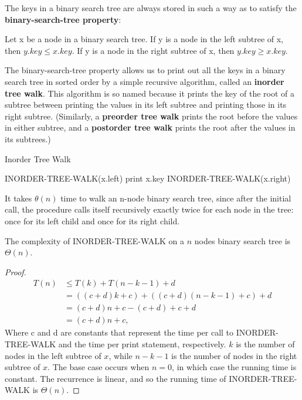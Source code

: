 The keys in a binary search tree are always stored in such a way as to satisfy the
\textbf{binary-search-tree property}:

\begin{definitionblock}
Let x be a node in a binary search tree. If y is a node in the left subtree of x, then $y.key \leq x.key$. If y is a node in the right subtree of x, then $y.key \geq x.key$.
\end{definitionblock}

The binary-search-tree property allows us to print out all the keys in a binary
search tree in sorted order by a simple recursive algorithm, called an \textbf{inorder tree
walk}. This algorithm is so named because it prints the key of the root of a subtree
between printing the values in its left subtree and printing those in its right subtree.
(Similarly, a \textbf{preorder tree walk} prints the root before the values in either subtree,
and a \textbf{postorder tree walk} prints the root after the values in its subtrees.)

\begin{algorithm}[H]
    \caption{Inorder Tree Walk}
    \begin{algorithmic}[1]
            \State INORDER-TREE-WALK(x.left)
            \State print x.key
            \State INORDER-TREE-WALK(x.right)
        \EndIf
    \end{algorithmic}
\end{algorithm}

It takes $\theta(n)$ time to walk an n-node binary search tree, since after the initial call, the procedure calls itself recursively exactly twice for each node in the tree: once for its left child and once for its right child.

\newtheorem{binary search}{theorem}

\begin{theorem}
    The complexity of \small INORDER-TREE-WALK \normalsize on a $n$ nodes binary search tree is $\Theta(n)$.
\end{theorem}

\begin{proof}
    \begin{align*}
    T(n) &\leq T(k) + T(n-k-1) + d \\
    &= ((c + d)k + c) + ((c + d)(n - k - 1) + c) + d \\
    &= (c + d)n + c - (c + d) + c + d \\
    &= (c + d)n + c,
    \end{align*}
    Where c and d are constants that represent the time per call to INORDER-TREE-WALK and the time per print statement, respectively.  $k$ is the number of nodes in the left subtree of $x$, while $n - k - 1$ is the number of nodes in the right subtree of $x$. The base case occurs when $n = 0$, in which case the running time is constant. The recurrence is linear, and so the running time of INORDER-TREE-WALK is \small{$\Theta(n)$}.
\end{proof}

